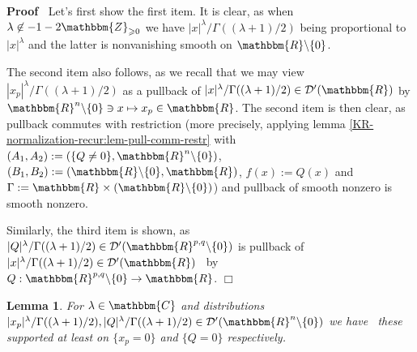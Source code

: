 \documentclass{article}
\newcommand{\assign}{:=}
\newcommand{\nin}{\not\in}
\newenvironment{proof}{\noindent\textbf{Proof\ }}{\hspace*{\fill}$\Box$\medskip}
\numberwithin{definition}{section}
\newtheorem{lemma}{Lemma}
\numberwithin{lemma}{section}
\numberwithin{proposition}{section}
{\theorembodyfont{\rmfamily}\newtheorem{remark}{Remark}
\numberwithin{remark}{section}
}
\begin{document}
\begin{proof}
  Let's first show the first item. It is clear, as when $\lambda \nin - 1 -
  2\mathbbm{Z}_{\geqslant 0}$ we have $| x |^{\lambda} / \Gamma ( ( \lambda +
  1) / 2)$ being proportional to $| x |^{\lambda}$ and the latter is
  nonvanishing smooth on $\mathbbm{R}\backslash \{ 0 \}$.
  
  The second item also follows, as we recall that we may view $| x_p
  |^{\lambda} / \Gamma ( ( \lambda + 1) / 2)$ as a pullback of $| x
  |^{\lambda} / \Gamma ( ( \lambda + 1) / 2) \in \mathcal{D}' ( \mathbbm{R})$
  by $\mathbbm{R}^n \backslash \{ 0 \} \ni x \mapsto x_p \in \mathbbm{R}$. The
  second item is then clear, as pullback commutes with restriction (more
  precisely, applying lemma \ref{KR-normalization-recur:lem-pull-comm-restr}
  with $( A_1, A_2) \assign ( \{ Q \neq 0 \}, \mathbbm{R}^n \backslash \{ 0
  \})$, $( B_1, B_2) \assign ( \mathbbm{R}\backslash \{ 0 \}, \mathbbm{R})$,
  $f ( x) \assign Q ( x)$ and $\Gamma \assign \mathbbm{R} \times (
  \mathbbm{R}\backslash \{ 0 \})$) and pullback of smooth nonzero is smooth
  nonzero.
  
  Similarly, the third item is shown, as $| Q |^{\lambda} / \Gamma ( ( \lambda
  + 1) / 2) \in \mathcal{D}' ( \mathbbm{R}^{p, q} \backslash \{ 0 \})$ is
  pullback of $| x |^{\lambda} / \Gamma ( ( \lambda + 1) / 2) \in \mathcal{D}'
  ( \mathbbm{R})$ \ by $Q : \mathbbm{R}^{p, q} \backslash \{ 0 \} \rightarrow
  \mathbbm{R}$.
\end{proof}

\begin{lemma}
  \label{supp-n-waves:lem-at-least}For $\lambda \in \mathbbm{C}$ and
  distributions $| x_p |^{\lambda} / \Gamma ( ( \lambda + 1) / 2), | Q
  |^{\lambda} / \Gamma ( ( \lambda + 1) / 2) \in \mathcal{D}' ( \mathbbm{R}^n
  \backslash \{ 0 \})$ we have \ these supported at least on $\{ x_p = 0 \}$
  and $\{ Q = 0 \}$ respectively.
\end{lemma}
\end{document}
